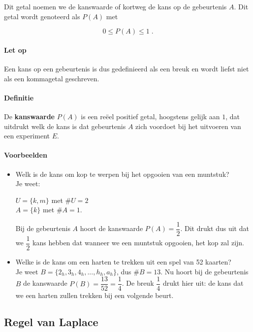 \documentclass[12pt,twoside]{article}
\begin{document}
Dit getal noemen we de kanswaarde of kortweg de kans op de gebeurtenis $A$. Dit getal wordt genoteerd als $P(A)$ met\\
\begin{mdframed}
$$0 \leq P(A) \leq 1\;.$$
\end{mdframed}

\paragraph*{Let op} Een kans op een gebeurtenis is dus gedefinieerd als een breuk en wordt liefst niet als
een kommagetal geschreven.

\paragraph*{Definitie} De {\bf kanswaarde} $P(A)$ is een reëel positief getal, hoogstens gelijk aan $1$, dat uitdrukt welk de kans is dat gebeurtenis $A$ zich voordoet bij het uitvoeren van een experiment $E$.

\paragraph*{Voorbeelden}

\begin{itemize}
  \item Welk is de kans om kop te werpen bij het opgooien van een muntstuk?\\
  Je weet:
  \begin{minipage}[t]{\textwidth}
    $U =\{k, m\}$ met $\#U = 2$\\
    $A = \{k\}$ met $\#A = 1$.
  \end{minipage}
  Bij de gebeurtenis $A$ hoort de kanswaarde $P(A) =\dfrac{1}{2}$. Dit drukt dus uit dat we $\dfrac{1}{2}$ kans hebben dat wanneer we een muntstuk opgooien, het kop zal zijn.
  \item Welke is de kans om een harten te trekken uit een spel van 52 kaarten?\\
  Je weet $B = \{2_h , 3_h , 4_h , ..., h_h , a_h\}$, dus $\#B=13$.
  Nu hoort bij de gebeurtenis $B$ de kanswaarde $P(B)=\dfrac{13}{52}=\dfrac{1}{4}$. De breuk $\dfrac{1}{4}$ drukt hier uit: de kans dat we een harten zullen trekken bij een volgende beurt.
\end{itemize}

\subsection{Regel van Laplace}
\end{document}
